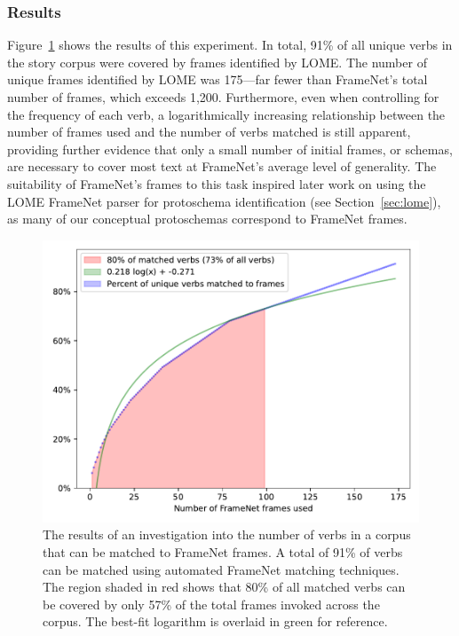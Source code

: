 \subsubsection{Results}
Figure~\ref{fig:fn_coverage} shows the results of this experiment. In total, 91\% of all unique verbs in the story corpus were covered by frames identified by LOME. The number of unique frames identified by LOME was 175---far fewer than FrameNet's total number of frames, which exceeds 1,200. Furthermore, even when controlling for the frequency of each verb, a logarithmically increasing relationship between the number of frames used and the number of verbs matched is still apparent, providing further evidence that only a small number of initial frames, or schemas, are necessary to cover most text at FrameNet's average level of generality. The suitability of FrameNet's frames to this task inspired later work on using the LOME FrameNet parser for protoschema identification (see Section~\ref{sec:lome}), as many of our conceptual protoschemas correspond to FrameNet frames.

\begin{figure}
    \centering
    \includegraphics[width=0.75\columnwidth]{CH3_schemas/framenet_coverage}
    \caption{The results of an investigation into the number of verbs in a corpus that can be matched to FrameNet frames. A total of 91\% of verbs can be matched using automated FrameNet matching techniques. The region shaded in red shows that 80\% of all matched verbs can be covered by only 57\% of the total frames invoked across the corpus. The best-fit logarithm is overlaid in green for reference.}
    \label{fig:fn_coverage}
\end{figure}
